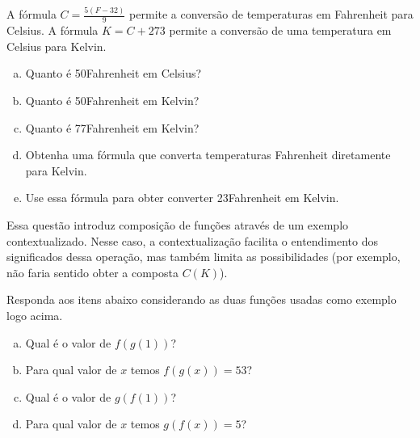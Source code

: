 \documentclass[main_estudante.tex]{subfiles}
\begin{document}


\begin{questao}
A fórmula $C=\frac{5(F-32)}{9}$ permite a conversão de temperaturas em Fahrenheit para Celsius. A fórmula $K=C+273$ permite a conversão de uma temperatura em Celsius para Kelvin.
\begin{enumerate}[a)]
\item Quanto é 50\degree Fahrenheit em Celsius?
\item Quanto é 50\degree Fahrenheit em Kelvin?
\item Quanto é 77\degree Fahrenheit em Kelvin?
\item Obtenha uma fórmula que converta temperaturas Fahrenheit diretamente para Kelvin.
\item Use essa fórmula para obter converter 23\degree Fahrenheit em Kelvin.
\end{enumerate}
\end{questao}

Essa questão introduz composição de funções através de um exemplo contextualizado. Nesse caso, a contextualização facilita o entendimento dos significados dessa operação, mas também limita as possibilidades (por exemplo, não faria sentido obter a composta $C(K)$).

\begin{questao}
Responda aos itens abaixo considerando as duas funções usadas como exemplo logo acima.
\begin{enumerate}[a)]
\item Qual é o valor de $f(g(1))$?
\item Para qual valor de $x$ temos $f(g(x))=53$?
\item Qual é o valor de $g(f(1))$?
\item Para qual valor de $x$ temos $g(f(x))=5$?
\end{enumerate}
\end{questao}
\end{document}
